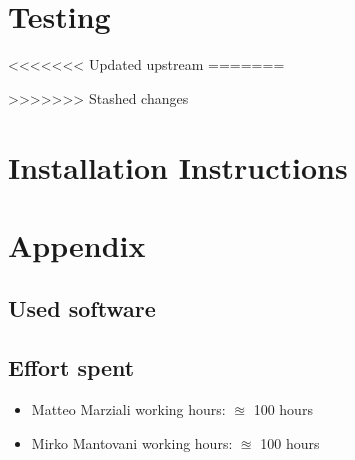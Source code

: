 \documentclass{article}
\begin{document}
\clearpage
\section{Testing}

<<<<<<< Updated upstream
=======

>>>>>>> Stashed changes
\clearpage
\section{Installation Instructions}




\clearpage
\section{Appendix}

\subsection{Used software}


\subsection{Effort spent}
\begin{itemize}

\item Matteo Marziali working hours:  $\approxeq$ 100 hours

\item Mirko Mantovani working hours:  $\approxeq$ 100 hours



\end{itemize}
\end{document}

